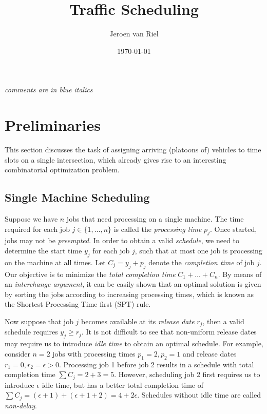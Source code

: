 \documentclass{article}
\title{Traffic Scheduling}
\author{Jeroen van Riel}
\date{\monthyeardate\today}
\theoremstyle{definition}
\theoremstyle{plain}
\begin{document}
\maketitle

\noindent
\textit{\color{blue}comments are in blue italics}

\section{Preliminaries}

This section discusses the task of assigning arriving (platoons of) vehicles to
time slots on a single intersection, which already gives rise to an interesting
combinatorial optimization problem.

\subsection{Single Machine Scheduling}

Suppose we have $n$ jobs that need processing on a single machine. The time
required for each job $j \in \{1, \dots, n\}$ is called the \textit{processing
  time} $p_{j}$. Once started, jobs may not be \textit{preempted}. In order to
obtain a valid \textit{schedule}, we need to determine the start time $y_{j}$
for each job $j$, such that at most one job is processing on the machine at all
times. Let $C_{j} = y_{j} + p_{j}$ denote the \textit{completion time} of job
$j$. Our objective is to minimize the \textit{total completion time}
$C_{1} + \dots + C_{n}$. By means of an \textit{interchange argument}, it can be
easily shown that an optimal solution is given by sorting the jobs according to
increasing processing times, which is known as the Shortest Processing Time
first (SPT) rule.

Now suppose that job $j$ becomes available at its \textit{release date} $r_{j}$,
then a valid schedule requires $y_{j} \geq r_{j}$. It is not difficult to see
that non-uniform release dates may require us to introduce \textit{idle time} to
obtain an optimal schedule. For example, consider $n=2$ jobs with processing
times $p_{1}=2, p_{2}=1$ and release dates $r_{1}=0, r_{2}=\epsilon > 0$.
Processing job 1 before job 2 results in a schedule with total completion time
$\sum C_{j} = 2 + 3 = 5$. However, scheduling job 2 first requires us to
introduce $\epsilon$ idle time, but has a better total completion time of
$\sum C_{j} = (\epsilon + 1) + (\epsilon + 1 + 2) = 4 + 2 \epsilon$. Schedules
without idle time are called \textit{non-delay}.
\end{document}
